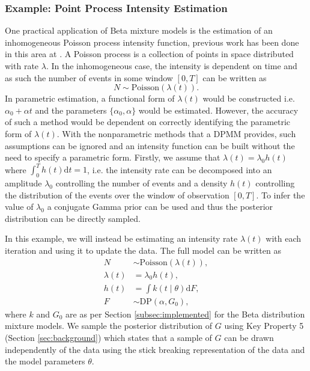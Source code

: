 \documentclass[nojss]{jss}
\begin{document}
\subsubsection{Example: Point Process Intensity Estimation}
One practical application of Beta mixture models is the estimation of an inhomogeneous Poisson process intensity function, previous work has been done in this area at \cite{taddy_mixture_2012}. A Poisson process is a collection of points in space distributed with rate $\lambda$. In the inhomogeneous case, the intensity is dependent on time and as such the number of events in some window $\left[0 , T\right]$ can be written as
\begin{equation*}
N \sim \text{Poisson} (\lambda (t) ).
\end{equation*}
In parametric estimation, a functional form of $\lambda (t)$ would be constructed i.e. $\alpha _0 + \alpha t$ and the parameters $\{\alpha _0, \alpha \}$ would be estimated. However, the accuracy of such a method would be dependent on correctly identifying the parametric form of $\lambda (t)$. With the nonparametric methods that a DPMM provides, such assumptions can be ignored and an intensity function can be built without the need to specify a parametric form. Firstly, we assume that $\lambda (t) = \lambda _0 h(t)$ where $\int _0 ^T h(t) \mathrm{d} t = 1$, i.e. the intensity rate can be decomposed into an amplitude $\lambda _0$ controlling the number of events and a density $h(t)$ controlling the distribution of the events over the window of observation $\left[0 , T\right]$. To infer the value of $\lambda _0$ a conjugate Gamma prior can be used and thus the posterior distribution can be directly sampled.

In this example, we will instead be estimating an intensity rate $\lambda (t)$ with each iteration and using it to update the data. The full model can be written as
\begin{align*}
N & \sim \text{Poisson} ( \lambda (t) ), \\
\lambda (t) & = \lambda _0 h(t), \\
h (t) & = \int k(t \mid \theta) \mathrm{d}F, \\
F & \sim \text{DP} (\alpha , G_0),
\end{align*}
where $k$ and $G_0$ are as per Section \ref{subsec:implemented} for the Beta distribution mixture models. We sample the posterior distribution of $G$ using Key Property 5 (Section \ref{sec:background}) which states that a sample of $G$ can be drawn independently of the data using the stick breaking representation of the data and the model parameters $\theta$.
\end{document}
